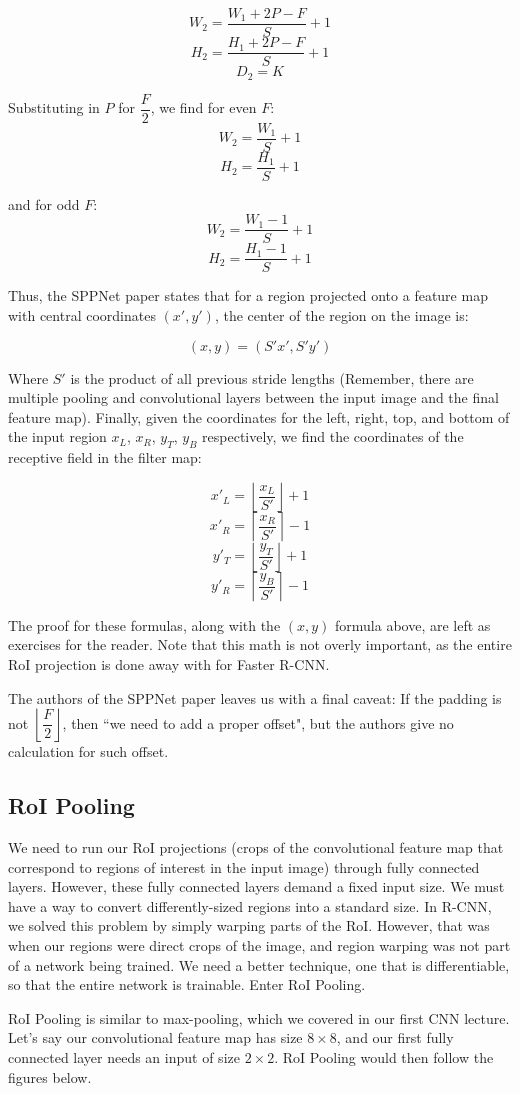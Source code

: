 \documentclass{article}
\def\lc{\left\lfloor}
\def\rc{\right\rfloor}
\def\lf{\left\lceil}
\def\rf{\right\rceil}
\begin{document}
\[W_2=\dfrac{W_1+2P-F}{S} + 1\]
\[H_2=\dfrac{H_1+2P-F}{S} + 1\]
\[D_2=K\]

Substituting in $P$ for $\dfrac{F}{2}$, we find for even $F$:
\[W_2=\dfrac{W_1}{S} + 1\]
\[H_2=\dfrac{H_1}{S} + 1\]

and for odd $F$:
\[W_2=\dfrac{W_1-1}{S} + 1\]
\[H_2=\dfrac{H_1-1}{S} + 1\]

Thus, the SPPNet paper states that for a region projected onto a feature map with central coordinates $(x',y')$, the center of the region on the image is:

\[(x,y) = (S'x', S'y')\]

Where $S'$ is the product of all previous stride lengths (Remember, there are multiple pooling and convolutional layers between the input image and the final feature map). Finally, given the coordinates for the left, right, top, and bottom of the input region $x_L$, $x_R$, $y_T$, $y_B$ respectively, we find the coordinates of the receptive field in the filter map:

\[x'_L = \lc \frac{x_L}{S'} \rc +1\]
\[x'_R = \lf \frac{x_R}{S'} \rf -1\]
\[y'_T = \lc \frac{y_T}{S'} \rc +1\]
\[y'_R = \lf \frac{y_B}{S'} \rf -1\]

The proof for these formulas, along with the $(x,y)$ formula above, are left as exercises for the reader. Note that this math is not overly important, as the entire RoI projection is done away with for Faster R-CNN.

The authors of the SPPNet paper leaves us with a final caveat: If the padding is not $\lc \dfrac{F}{2} \rc$, then ``we need to add a proper offset", but the authors give no calculation for such offset.

\subsection{RoI Pooling}
We need to run our RoI projections (crops of the convolutional feature map that correspond to regions of interest in the input image) through fully connected layers. However, these fully connected layers demand a fixed input size. We must have a way to convert differently-sized regions into a standard size. In R-CNN, we solved this problem by simply warping parts of the RoI. However, that was when our regions were direct crops of the image, and region warping was not part of a network being trained. We need a better technique, one that is differentiable, so that the entire network is trainable. Enter RoI Pooling.

RoI Pooling is similar to max-pooling, which we covered in our first CNN lecture. Let's say our convolutional feature map has size $8\times8$, and our first fully connected layer needs an input of size $2\times2$. RoI Pooling would then follow the figures below.
\end{document}
